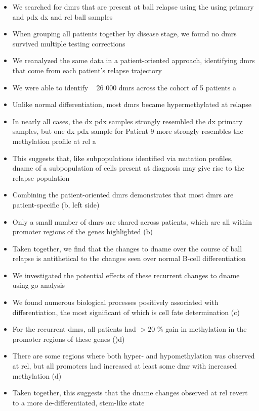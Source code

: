 \begin{itemize}
  \item We searched for \glspl{dmr} that are present at \gls{ball} relapse using the using primary and \gls{pdx} \gls{dx} and \gls{rel} \gls{ball} samples
  \item When grouping all patients together by disease stage, we found no \glspl{dmr} survived multiple testing corrections
  \item We reanalyzed the same data in a patient-oriented approach, identifying \glspl{dmr} that come from each patient's relapse trajectory
  \item We were able to identify ~ 26 000 \glspl{dmr} across the cohort of 5 patients a
  \item Unlike normal differentiation, most \glspl{dmr} became hypermethylated at relapse
  \item In nearly all cases, the \gls{dx} \gls{pdx} samples strongly resembled the \gls{dx} primary samples, but one \gls{dx} \gls{pdx} sample for Patient 9 more strongly resembles the methylation profile at \gls{rel} a
  \item This suggests that, like subpopulations identified via mutation profiles, \gls{dname} of a subpopulation of cells present at diagnosis may give rise to the relapse population
  \item Combining the patient-oriented \glspl{dmr} demonstrates that most \glspl{dmr} are patient-specific (b, left side)
  \item Only a small number of \glspl{dmr} are shared across patients, which are all within promoter regions of the genes highlighted (b)
  \item Taken together, we find that the changes to \gls{dname} over the course of \gls{ball} relapse is antithetical to the changes seen over normal B-cell differentiation
\end{itemize}

\begin{itemize}
  \item We investigated the potential effects of these recurrent changes to \gls{dname} using \gls{go} analysis
  \item We found numerous biological processes positively associated with differentiation, the most significant of which is cell fate determination (c)
  \item For the recurrent \glspl{dmr}, all patients had $> 20$ \% gain in methylation in the promoter regions of these genes ()d)
  \item There are some regions where both hyper- and hypomethylation was observed at \gls{rel}, but all promoters had increased at least some \gls{dmr} with increased methylation (d)
  \item Taken together, this suggests that the \gls{dname} changes observed at \gls{rel} revert to a more de-differentiated, stem-like state
\end{itemize}

